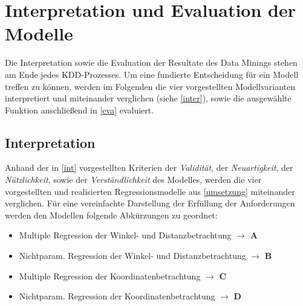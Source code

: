\section{Interpretation und Evaluation der Modelle}
\label{iue}
Die Interpretation sowie die Evaluation der Resultate des Data Minings stehen am Ende jedes KDD-Prozesses. Um eine fundierte Entscheidung für ein Modell treffen zu können, werden im Folgenden die vier vorgestellten Modellvarianten interpretiert und miteinander verglichen (siehe \vref{inter}), sowie die ausgewählte Funktion anschließend in \vref{eva} evaluiert.

\subsection{Interpretation}
\label{inter}
Anhand der in \vref{int} vorgestellten Kriterien der \textit{Validität}, der \textit{Neuartigkeit}, der \textit{Nützlichkeit}, sowie der \textit{Verständlichkeit} des Modelles, werden die vier vorgestellten und realisierten Regressionsmodelle aus \vref{umsetzung} miteinander verglichen. Für eine vereinfachte Darstellung der Erfüllung der Anforderungen werden den Modellen folgende Abkürzungen zu geordnet:

\begin{itemize}
\item Multiple Regression der Winkel- und Distanzbetrachtung $\rightarrow$ \textbf{A}
\item Nichtparam. Regression der Winkel- und Distanzbetrachtung $\rightarrow$ \textbf{B}
\item Multiple Regression der Koordinatenbetrachtung $\rightarrow$ \textbf{C}
\item Nichtparam. Regression der Koordinatenbetrachtung $\rightarrow$ \textbf{D}
\end{itemize}

